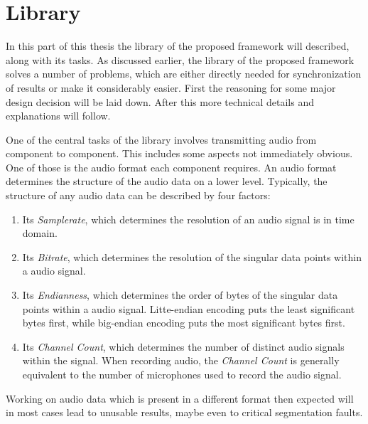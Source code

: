 


\section{Library}
\label{main:lib}
In this part of this thesis the library of the proposed framework will described, along with its tasks.
As discussed earlier, the library of the proposed framework solves a number of problems, which are either directly needed for synchronization of results or make it considerably easier.
First the reasoning for some major design decision will be laid down.
After this more technical details and explanations will follow.


\label{main:lib:formats}
One of the central tasks of the library involves transmitting audio from component to component.
This includes some aspects not immediately obvious.
One of those is the audio format each component requires.
An audio format determines the structure of the audio data on a lower level.
Typically, the structure of any audio data can be described by four factors:
\begin{enumerate}
	\item Its \textit{Samplerate}, which determines the resolution of an audio signal is in time domain.
	\item Its \textit{Bitrate}, which determines the resolution of the singular data points within a audio signal.
	\item Its \textit{Endianness}, which determines the order of bytes of the singular data points within a audio signal. Litte-endian encoding puts the least significant bytes first, while big-endian encoding puts the most significant bytes first. 
	\item Its \textit{Channel Count}, which determines the number of distinct audio signals within the signal. When recording audio, the \textit{Channel Count} is generally equivalent to the number of microphones used to record the audio signal.
\end{enumerate}
Working on audio data which is present in a different format then expected will in most cases lead to unusable results, maybe even to critical segmentation faults. 

